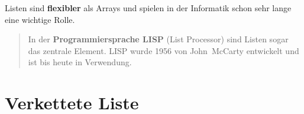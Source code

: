 \begin{multicols}{2}
\begin{frame}[fragile]
\pause%
Listen sind \textbf{flexibler} als Arrays und spielen in der Informatik schon sehr lange eine wichtige Rolle. 

\begin{quote}
In der \textbf{Programmiersprache LISP} (List Processor) sind Listen sogar das zentrale Element.
LISP wurde 1956 von John~McCarty entwickelt und ist bis heute in Verwendung.
\end{quote}

\end{frame}

\end{multicols}

\section{Verkettete Liste}
